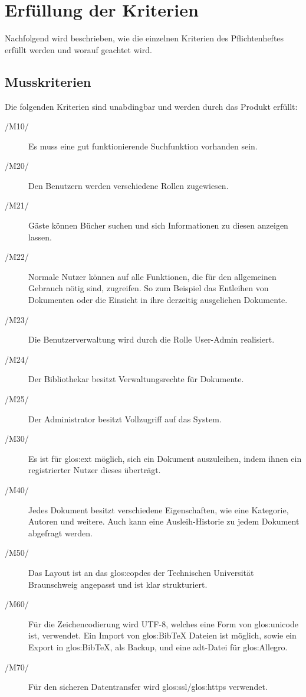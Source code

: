 \chapter{Erfüllung der Kriterien}

Nachfolgend wird beschrieben, wie die einzelnen Kriterien des Pflichtenheftes
erfüllt werden und worauf geachtet wird.
\section{Musskriterien}

Die folgenden Kriterien sind unabdingbar und werden durch das Produkt erfüllt:
\begin{description}
  \item[/M10/] Es muss eine gut funktionierende Suchfunktion vorhanden sein.
  \item[/M20/] Den Benutzern werden verschiedene Rollen zugewiesen.
  \item[/M21/] Gäste können Bücher suchen und sich Informationen zu diesen
	anzeigen lassen.
  \item[/M22/] Normale Nutzer können auf alle Funktionen, die für den
	allgemeinen Gebrauch nötig sind, zugreifen. So zum Beispiel
	das Entleihen von Dokumenten oder die Einsicht in ihre derzeitig
	ausgeliehen Dokumente.
  \item[/M23/] Die Benutzerverwaltung wird durch die Rolle User-Admin realisiert.
  \item[/M24/] Der Bibliothekar besitzt Verwaltungsrechte für Dokumente.
  \item[/M25/] Der Administrator besitzt Vollzugriff auf das System.
  \item[/M30/] Es ist für \gls{glos:ext} möglich, sich ein Dokument auszuleihen,
	indem ihnen ein registrierter Nutzer dieses überträgt.
  \item[/M40/] Jedes Dokument besitzt verschiedene Eigenschaften, wie eine
	Kategorie, Autoren und weitere. Auch kann eine Ausleih-Historie zu jedem
	Dokument abgefragt werden.
  \item[/M50/] Das Layout ist an das \gls{glos:copdes} der Technischen
	Universität Braunschweig angepasst und ist klar strukturiert.
  \item[/M60/] Für die Zeichencodierung wird UTF-8, welches eine Form von
	\gls{glos:unicode} ist, verwendet.
	Ein Import von \gls{glos:BibTeX} Dateien ist möglich, sowie ein Export in
	\gls{glos:BibTeX}, als Backup, und eine adt-Datei für \gls{glos:Allegro}.
  \item[/M70/] Für den sicheren Datentransfer wird \gls{glos:ssl}/\gls{glos:https} verwendet.
\end{description}

